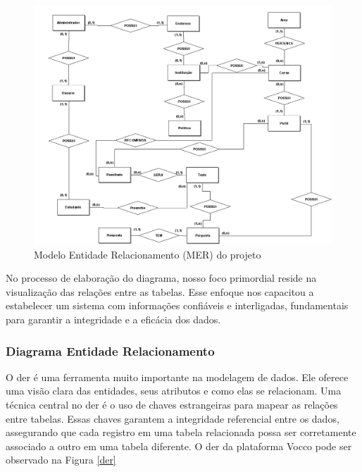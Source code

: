 \newpage
\begin{figure}[ht]
        \centering
\includegraphics[width=1.0\textwidth]{images/mer.png}
        \caption{Modelo Entidade Relacionamento (MER) do projeto}
        \label{mer}
    \end{figure}
    
No processo de elaboração do diagrama, nosso foco primordial reside na visualização das relações entre as tabelas. Esse enfoque nos capacitou a estabelecer um sistema com informações confiáveis e interligadas, fundamentais para garantir a integridade e a eficácia dos dados. 

\newpage

\subsubsection{Diagrama Entidade Relacionamento}

O \ac{der} é uma ferramenta muito importante na modelagem de dados. Ele oferece uma visão clara das entidades, seus atributos e como elas se relacionam. Uma técnica central no \ac{der} é o uso de chaves estrangeiras para mapear as relações entre tabelas. Essas chaves garantem a integridade referencial entre os dados, assegurando que cada registro em uma tabela relacionada possa ser corretamente associado a outro em uma tabela diferente. O \ac{der} da plataforma Vocco pode ser observado na Figura \ref{der}

